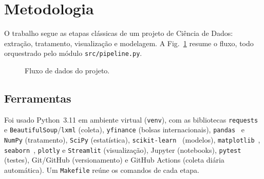 \documentclass[conference]{IEEEtran}
\begin{document}
\section{Metodologia}

O trabalho segue as etapas clássicas de um projeto de Ciência de Dados: extração, tratamento,
visualização e modelagem. A Fig.~\ref{fig:pipeline} resume o fluxo, todo orquestrado pelo módulo
\texttt{src/pipeline.py}.

\begin{figure}[!tb]
\centering
{}
\caption{Fluxo de dados do projeto.}
\label{fig:pipeline}
\end{figure}

\subsection{Ferramentas}

Foi usado Python~3.11 em ambiente virtual (\texttt{venv}), com as bibliotecas \texttt{requests} e
\texttt{BeautifulSoup}/\texttt{lxml} (coleta), \texttt{yfinance} (bolsas internacionais), \texttt{pandas}~\cite{pandas} e
\texttt{NumPy} (tratamento), \texttt{SciPy} (estatística), \texttt{scikit-learn}~\cite{sklearn} (modelos),
\texttt{matplotlib}~\cite{matplotlib}, \texttt{seaborn}~\cite{seaborn}, \texttt{plotly} e \texttt{Streamlit} (visualização), Jupyter (notebooks),
\texttt{pytest} (testes), Git/GitHub (versionamento) e GitHub Actions (coleta diária automática). Um
\texttt{Makefile} reúne os comandos de cada etapa.
\end{document}
